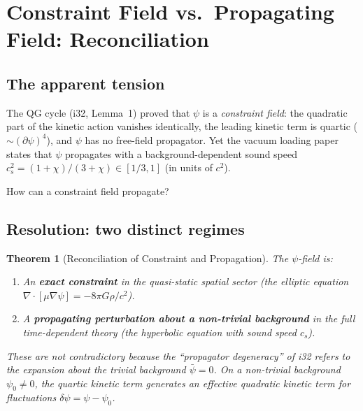 \documentclass[11pt,a4paper]{article}
\newtheorem{theorem}{Theorem}[section]
\begin{document}
\section{Constraint Field vs.\ Propagating Field: Reconciliation}
\label{sec:constraint-propagation}

\subsection{The apparent tension}

The QG cycle (i32, Lemma~1) proved that $\psi$ is a \emph{constraint field}:
the quadratic part of the kinetic action vanishes identically, the leading
kinetic term is quartic ($\sim (\partial\psi)^4$), and $\psi$ has no
free-field propagator.  Yet the vacuum loading paper states that $\psi$
propagates with a background-dependent sound speed
$c_s^2 = (1+\chi)/(3+\chi) \in [1/3, 1]$ (in units of $c^2$).

How can a constraint field propagate?

\subsection{Resolution: two distinct regimes}

\begin{theorem}[Reconciliation of Constraint and Propagation]
\label{thm:reconciliation}
The $\psi$-field is:
\begin{enumerate}
\item[(a)] An \textbf{exact constraint} in the quasi-static spatial sector
(the elliptic equation $\nabla\cdot[\mu\nabla\psi] = -8\pi G\rho/c^2$).
\item[(b)] A \textbf{propagating perturbation about a non-trivial
background} in the full time-dependent theory (the hyperbolic equation
with sound speed $c_s$).
\end{enumerate}
These are not contradictory because the ``propagator degeneracy'' of i32
refers to the expansion about the \emph{trivial} background $\bar\psi = 0$.
On a non-trivial background $\psi_0 \neq 0$, the quartic kinetic term
generates an effective quadratic kinetic term for fluctuations
$\delta\psi = \psi - \psi_0$.
\end{theorem}
\end{document}
